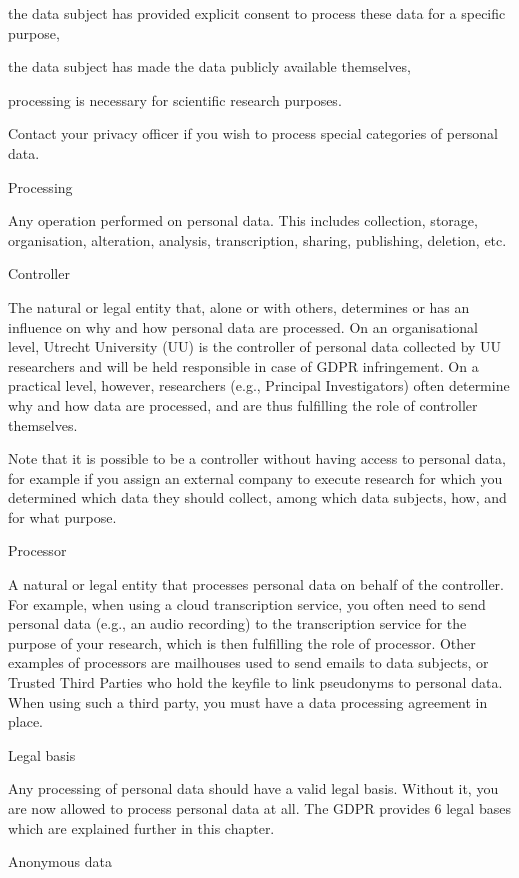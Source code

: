 \documentclass[
]{book}
\begin{document}
the data subject has provided explicit consent to process these data for
a specific purpose,

the data subject has made the data publicly available themselves,

processing is necessary for scientific research purposes.

Contact your privacy
officer if you wish to process special categories of personal data.

Processing

Any operation performed on personal data. This includes collection, storage,
organisation, alteration, analysis, transcription, sharing, publishing, deletion, etc.

Controller

The natural or legal entity that, alone or with others, determines or has an
influence on why and how personal data are processed. On an
organisational level, Utrecht University (UU) is the controller of personal
data collected by UU researchers and will be held responsible in case of GDPR
infringement. On a practical level, however, researchers (e.g., Principal
Investigators) often determine why and how data are processed, and are thus
fulfilling the role of controller themselves.

Note that it is possible to be a controller without having access to personal
data, for example if you assign an external company to execute research for
which you determined which data they should collect, among which data subjects,
how, and for what purpose.

Processor

A natural or legal entity that processes personal data on behalf of the
controller. For example, when using a cloud transcription service, you often
need to send personal data (e.g., an audio recording) to the transcription
service for the purpose of your research, which is then fulfilling the role
of processor. Other examples of processors are mailhouses used to send emails
to data subjects, or Trusted Third Parties who hold the keyfile to link
pseudonyms to personal data. When using such a third party, you must have a
data processing agreement in place.

Legal basis

Any processing of personal data should have a valid legal basis. Without it,
you are now allowed to process personal data at all. The GDPR provides 6 legal
bases which are explained further in this chapter.

Anonymous data
\end{document}
